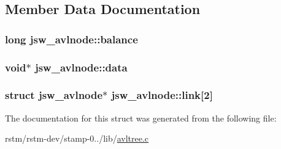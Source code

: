 \subsection{Member Data Documentation}
\hypertarget{structjsw__avlnode_a73ff0e730ededb2e85dff0eefbb8d6ae}{
\subsubsection[{balance}]{\setlength{\rightskip}{0pt plus 5cm}long jsw\-\_\-avlnode\-::balance}}\label{structjsw__avlnode_a73ff0e730ededb2e85dff0eefbb8d6ae}
\hypertarget{structjsw__avlnode_a88870a15890591a8a14f207d74024240}{
\subsubsection[{data}]{\setlength{\rightskip}{0pt plus 5cm}void$\ast$ jsw\-\_\-avlnode\-::data}}\label{structjsw__avlnode_a88870a15890591a8a14f207d74024240}
\hypertarget{structjsw__avlnode_ad767c30f18c6d3e4f6598aadeb31736a}{
\subsubsection[{link}]{\setlength{\rightskip}{0pt plus 5cm}struct {\bf jsw\-\_\-avlnode}$\ast$ jsw\-\_\-avlnode\-::link\mbox{[}2\mbox{]}}}\label{structjsw__avlnode_ad767c30f18c6d3e4f6598aadeb31736a}


The documentation for this struct was generated from the following file\-:\begin{DoxyCompactItemize}
\item 
rstm/rstm-\/dev/stamp-\/0../lib/\hyperlink{avltree_8c}{avltree.\-c}\end{DoxyCompactItemize}
